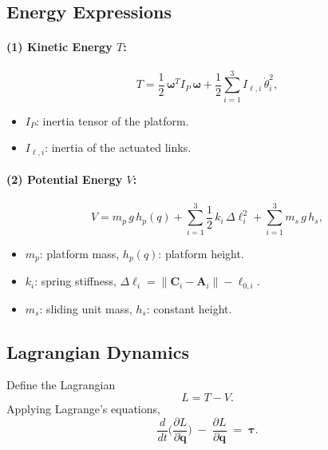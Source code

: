 \documentclass[letterpaper, 10 pt, conference]{ieeeconf}  %
\begin{document}
\subsection{Energy Expressions}

\paragraph{(1) Kinetic Energy \(T\):}
\[
  T = \frac{1}{2}\,\boldsymbol{\omega}^T I_P\,\boldsymbol{\omega}
      + \frac{1}{2}\sum_{i=1}^3 I_{\ell,i}\,\dot\theta_i^2,
\]
\begin{itemize}
  \item \(I_P\): inertia tensor of the platform.
  \item \(I_{\ell,i}\): inertia of the actuated links.
\end{itemize}

\paragraph{(2) Potential Energy \(V\):}
\[
  V = m_p\,g\,h_p(q)
      + \sum_{i=1}^3 \frac{1}{2}\,k_i\,\Delta\ell_i^2
      + \sum_{i=1}^3 m_s\,g\,h_s,
\]
\begin{itemize}
  \item \(m_p\): platform mass, \(h_p(q)\): platform height.
  \item \(k_i\): spring stiffness, 
        \(\Delta \ell_i = \|\mathbf{C}_i - \mathbf{A}_i\| - \ell_{0,i}\).
  \item \(m_s\): sliding unit mass, \(h_s\): constant height.
\end{itemize}

\subsection{Lagrangian Dynamics}
Define the Lagrangian
\[
  L = T - V.
\]
Applying Lagrange’s equations,
\[
  \frac{d}{dt}\biggl(\frac{\partial L}{\partial \dot{\mathbf{q}}}\biggr)
  \;-\;
  \frac{\partial L}{\partial \mathbf{q}}
  \;=\;
  \boldsymbol{\tau}.
\]
\end{document}
